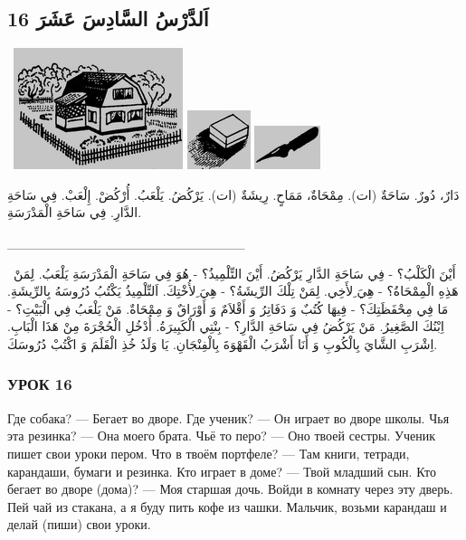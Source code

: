 \documentclass[a5paper]{article}
\begin{document}
\subsection[16 اَلدَّرْسُ السَّادِسَ عَشَرَ]{16 اَلدَّرْسُ السَّادِسَ عَشَرَ}
\  \includegraphics[width=1.948in,height=1.3957in]{MuhammadBagauddinlatinized-img029.jpg}   \includegraphics[width=0.7291in,height=0.6772in]{MuhammadBagauddinlatinized-img030.jpg}   \includegraphics[width=0.7602in,height=0.5in]{MuhammadBagauddinlatinized-img031.jpg} 

دَارٌ، دُورٌ. سَاحَةٌ (ات). مِمْحَاةٌ، مَمَاحٍ. رِيشَةٌ (ات). يَرْكُضُ. يَلْعَبُ. أُرْكُضْ. إِلْعَبْ. فِي سَاحَةِ الدَّارِ. فِي سَاحَةِ الْمَدْرَسَةِ.

\_\_\_\_\_\_\_\_\_\_\_\_\_\_\_\_\_\_\_\_\_\_\_\_\_

\ أَيْنَ الْكَلْبُ؟ - فِي سَاحَةِ الدَّارِ يَرْكُضُ. أَيْنَ التِّلْمِيذُ؟ - هُوَ فِي سَاحَةِ الْمَدْرَسَةِ يَلْعَبُ. لِمَنْ هَذِهِ الْمِمْحَاةُ؟ - هِيَ ِلأَخِي. لِمَنْ تِلْكَ الرِّيشَةُ؟ - هِيَ ِلأُخْتِكَ. اَلتِّلْمِيذُ يَكْتُبُ دُرُوسَهُ بِالرِّيشَةِ. مَا فِي مِحْفَظَتِكَ؟ - فِيهَا كُتُبٌ وَ دَفَاتِرُ وَ أَقْلاَمٌ وَ أَوْرَاقٌ وَ مِمْحَاةٌ. مَنْ يَلْعَبُ فِي الْبَيْتِ؟ - اِبْنُكَ الصَّغِيرُ. مَنْ يَرْكُضُ فِي سَاحَةِ الدَّارِ؟ - بِنْتِي الْكَبِيرَةُ. أُدْخُلِ الْحُجْرَةَ مِنْ هَذَا الْبَابِ. اِشْرَبِ الشَّايَ بِالْكُوبِ وَ أَنَا أَشْرَبُ الْقَهْوَةَ بِالْفِنْجَانِ. يَا وَلَدُ خُذِ الْقَلَمَ وَ اكْتُبْ دُرُوسَكَ.

\subsubsection{УРОК 16}
Где собака? — Бегает во дворе. Где ученик? — Он играет во дворе школы. Чья эта резинка? — Она моего брата. Чьё то перо? — Оно твоей сестры. Ученик пишет свои уроки пером. Что в твоём портфеле? — Там книги, тетради, карандаши, бумаги и резинка. Кто играет в доме? — Твой младший сын. Кто бегает во дворе (дома)? — Моя старшая дочь. Войди в комнату через эту дверь. Пей чай из стакана, а я буду пить кофе из чашки. Мальчик, возьми карандаш и делай (пиши) свои уроки.
\end{document}
